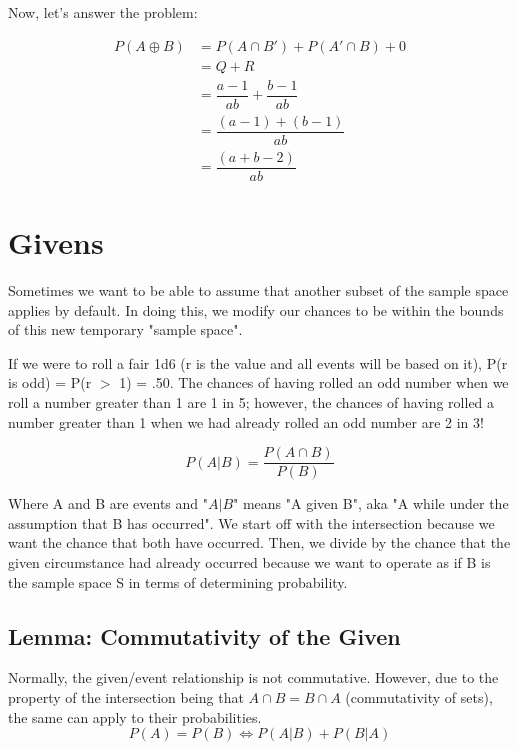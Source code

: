 \documentclass[]{article}
\begin{document}
			Now, let's answer the problem:
			
			\begin{align*}
			P(A \oplus B) &= P(A \cap B') + P(A' \cap B) + 0 \\
			              &= Q + R \\
			              &= \dfrac{a - 1}{ab} + \dfrac{b - 1}{ab} \\
			              &= \dfrac{(a-1) + (b-1)}{ab} \\
			              &= \dfrac{(a + b - 2)}{ab}
			\end{align*}	
	\pagebreak
	\section{Givens}
		Sometimes we want to be able to assume that another subset of the sample space applies by default. In doing this, we modify our chances to be within the bounds of this new temporary "sample space".
		
		If we were to roll a fair 1d6 (r is the value and all events will be based on it), P(r is odd) = P(r $>$ 1) = .50. The chances of having rolled an odd number when we roll a number greater than 1 are 1 in 5; however, the chances of having rolled a number greater than 1 when we had already rolled an odd number are 2 in 3!
		
		\begin{equation}
			P(A|B) = \dfrac{P(A\cap B)}{P(B)}
		\end{equation}
		
		Where A and B are events and "$A|B$" means "A given B", aka "A while under the assumption that B has occurred". We start off with the intersection because we want the chance that both have occurred. Then, we divide by the chance that the given circumstance had already occurred because we want to operate as if B is the sample space S in terms of determining probability.
		
		\subsection{Lemma: Commutativity of the Given}
			Normally, the given/event relationship is not commutative. However, due to the property of the intersection being that $A \cap B = B \cap A$ (commutativity of sets), the same can apply to their probabilities.
			\begin{equation}
				P(A) = P(B) \iff P(A|B) + P(B|A)
			\end{equation}
\end{document}
